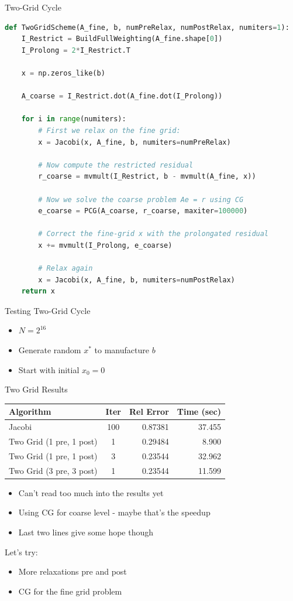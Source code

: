 \documentclass[11pt]{beamer}
\begin{document}
\begin{frame}[fragile]{Two-Grid Cycle}
\begin{lstlisting}[language=Python]
def TwoGridScheme(A_fine, b, numPreRelax, numPostRelax, numiters=1):
    I_Restrict = BuildFullWeighting(A_fine.shape[0])
    I_Prolong = 2*I_Restrict.T
    
    x = np.zeros_like(b)
    
    A_coarse = I_Restrict.dot(A_fine.dot(I_Prolong))
    
    for i in range(numiters):
        # First we relax on the fine grid:
        x = Jacobi(x, A_fine, b, numiters=numPreRelax) 
        
        # Now compute the restricted residual
        r_coarse = mvmult(I_Restrict, b - mvmult(A_fine, x)) 
    
        # Now we solve the coarse problem Ae = r using CG
        e_coarse = PCG(A_coarse, r_coarse, maxiter=100000)

        # Correct the fine-grid x with the prolongated residual
        x += mvmult(I_Prolong, e_coarse) 
    
        # Relax again
        x = Jacobi(x, A_fine, b, numiters=numPostRelax) 
    return x
\end{lstlisting}
\end{frame}
\begin{frame}{Testing Two-Grid Cycle}
  \begin{itemize}
  \item $N = 2^{16}$
  \item Generate random $x^*$ to manufacture $b$
  \item Start with initial $x_0 = 0$
  \end{itemize}
\end{frame}
\begin{frame}{Two Grid Results}
  \begin{tabular}{lcrr}
    Algorithm & Iter & Rel Error & Time (sec) \\
    \hline
    Jacobi                   & 100 &  0.87381  & 37.455 \\
    Two Grid (1 pre, 1 post) & 1	 &  0.29484  &  8.900 \\
    Two Grid (1 pre, 1 post) & 3	 &  0.23544  & 32.962 \\
    Two Grid (3 pre, 3 post) & 1	 &  0.23544  & 11.599
  \end{tabular}
  \begin{itemize}
  \item Can't read too much into the results yet
  \item Using CG for coarse level - maybe that's the speedup
  \item Last two lines give some hope though
  \end{itemize}

  Let's try:
  \begin{itemize}
  \item More relaxations pre and post
  \item CG for the fine grid problem
  \end{itemize}
\end{frame}
\end{document}
